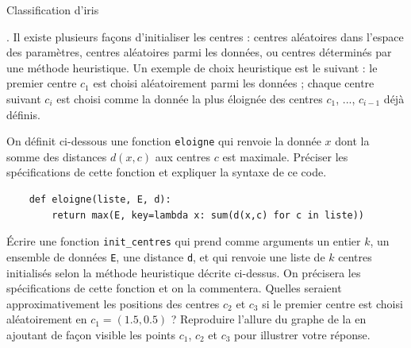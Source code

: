 \begin{exo}[PC][2][devoir]{Classification d'iris}
\begin{center}
  \end{center}
. Il existe plusieurs façons d'initialiser les centres : centres aléatoires dans l'espace des paramètres, centres aléatoires parmi les données, ou centres déterminés par une méthode heuristique. Un exemple de choix heuristique est le suivant : le premier centre $c_1$ est choisi aléatoirement parmi les données ; chaque centre suivant $c_i$ est choisi comme la donnée la plus éloignée des centres $c_1$, ..., $c_{i-1}$ déjà définis.
\begin{quest}
  \item	On définit ci-dessous une fonction \texttt{eloigne} qui renvoie la donnée $x$ dont la somme des distances $d(x,c)$ aux centres $c$ est maximale. Préciser les spécifications de cette fonction et expliquer la syntaxe de ce code.
  \begin{verbatim}
    def eloigne(liste, E, d):
        return max(E, key=lambda x: sum(d(x,c) for c in liste))    
  \end{verbatim}
  \item Écrire une fonction \texttt{init\_centres} qui prend comme arguments un entier $k$, un ensemble de données \texttt{E}, une distance \texttt{d}, et qui renvoie une liste de $k$ centres initialisés selon la méthode heuristique décrite ci-dessus. On précisera les spécifications de cette fonction et on la commentera. Quelles seraient approximativement les positions des centres $c_2$ et $c_3$ si le premier centre est choisi aléatoirement en $c_1=(1.5,0.5)$ ? Reproduire l'allure du graphe de la  en ajoutant de façon visible les points $c_1$, $c_2$ et $c_3$ pour illustrer votre réponse.
\end{quest}
\end{exo}
